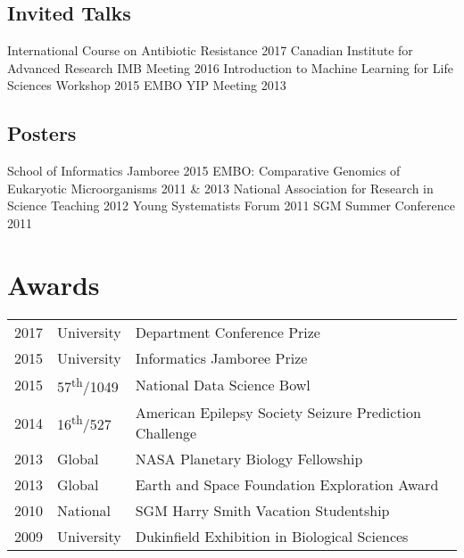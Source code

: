 \documentclass[]{Finlay_Maguire_CV}
\begin{document}
\begin{minipage}[t]{0.66\textwidth}
\subsection{Invited Talks}
    International Course on Antibiotic Resistance 2017 \textbullet{}
    Canadian Institute for Advanced Research IMB Meeting 2016 \textbullet{}
    Introduction to Machine Learning for Life Sciences Workshop 2015 \textbullet{}
EMBO YIP Meeting 2013\\
\vspace{0.1cm}
\subsection{Posters}
School of Informatics Jamboree 2015 \textbullet{} 
    EMBO: Comparative Genomics of Eukaryotic Microorganisms 2011 \& 2013 \textbullet{}
    National Association for Research in Science Teaching 2012 \textbullet{}
    Young Systematists Forum 2011 \textbullet{} SGM Summer Conference 2011 \\

\sectionsep


\section{Awards} 
\begin{tabular}{rll}
2017         & University  & Department Conference Prize \\
2015	     & University  & Informatics Jamboree Prize \\
2015         & 57\textsuperscript{th}/1049 & National Data Science Bowl\\
2014         & 16\textsuperscript{th}/527 & American Epilepsy Society Seizure Prediction Challenge \\
2013	     & Global & NASA Planetary Biology Fellowship \\
2013	     & Global & Earth and Space Foundation Exploration Award\\
2010     & National & SGM Harry Smith Vacation Studentship\\
2009     & University & Dukinfield Exhibition in Biological Sciences\\
\end{tabular}


\end{minipage}
\end{document}
